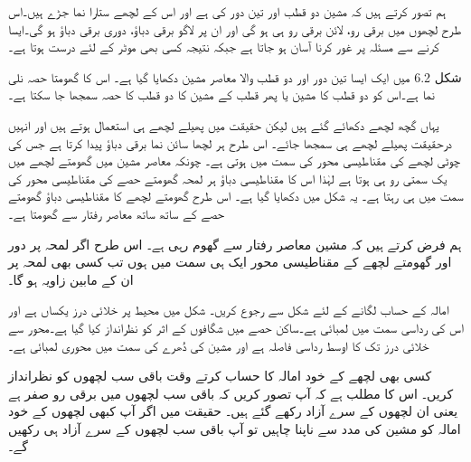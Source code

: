  ہم تصور کرتے ہیں کہ مشین دو قطب اور تین دور کی ہے اور اس کے لچھے ستارا نما جڑے  ہیں۔اس طرح لچھوں میں برقی رو، لائن برقی رو ہی ہو گی اور ان پر لاگو برقی دباؤ، دوری برقی دباؤ ہو گی۔ایسا کرنے سے مسئلہ پر غور کرنا آسان ہو جاتا ہے جبکہ نتیجہ کسی بھی موٹر کے لئے درست ہوتا ہے۔

شکل 6.2 میں ایک ایسا تین دور اور دو قطب والا معاصر مشین دکھایا گیا ہے۔ اس کا گھومتا حصہ نلی نما ہے۔اس کو دو قطب کا مشین یا پھر  قطب کے مشین کا دو قطب کا حصہ سمجھا جا سکتا ہے۔

 یہاں گچھ لچھے دکھائے گئے ہیں لیکن حقیقت میں پھیلے لچھے ہی استعمال ہوتے ہیں اور انہیں درحقیقت پھیلے لچھے ہی سمجھا جائے۔ اس طرح ہر لچھا سائن نما برقی دباؤ پیدا کرتا ہے جس کی چوٹی لچھے کی مقناطیسی محور کی سمت میں ہوتی ہے۔  چونکہ معاصر مشین میں گھومتے لچھے میں یک سمتی رو ہی ہوتا ہے لہٰذا اس کا مقناطیسی دباؤ ہر لمحہ گھومتے حصے کی مقناطیسی محور کی سمت میں ہی رہتا ہے۔ یہ شکل میں دکھایا گیا ہے۔ اس طرح گھومتے لچھے کا مقناطیسی دباؤ گھومتے حصے کے ساتھ ساتھ معاصر رفتار سے گھومتا ہے۔

ہم فرض کرتے ہیں کہ مشین معاصر رفتار  سے گھوم رہی ہے۔ اس طرح اگر لمحہ  پر دور  اور گھومتے لچھے کے مقناطیسی محور ایک ہی سمت میں ہوں تب کسی بھی لمحہ  پر ان کے مابین زاویہ  ہو گا۔

امالہ کے حساب لگانے کے لئے شکل  سے رجوع کریں۔ شکل میں محیط پر خلائی درز یکساں ہے  اور اس کی رداسی سمت میں لمبائی  ہے۔ساکن حصے میں شگافوں کے اثر کو نظرانداز کیا گیا ہے۔محور سے خلائی درز تک کا اوسط رداسی فاصلہ  ہے اور مشین کی دُھرے کی سمت میں محوری لمبائی  ہے۔

کسی بھی لچھے کے خود امالہ کا حساب کرتے وقت باقی سب لچھوں کو نظرانداز کریں۔ اس کا مطلب ہے کہ آپ تصور کریں کہ باقی سب لچھوں میں برقی رو صفر ہے یعنی ان لچھوں  کے سرے آزاد رکھے گئے ہیں۔ حقیقت میں اگر آپ کبھی لچھوں کے خود امالہ کو مشین کی مدد سے ناپنا چاہیں تو آپ باقی سب لچھوں کے سرے آزاد ہی رکھیں گے۔ 

